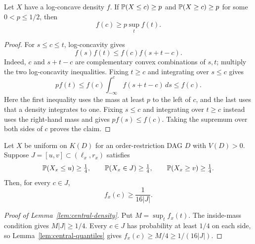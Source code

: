 \begin{lemma}\label{lem:central-quantiles}
Let $X$ have a log-concave density $f$. If
$\mathbb P(X\le c)\ge p$ and $\mathbb P(X\ge c)\ge p$ for some $0<p\le1/2$, then
\[
f(c)\ge p\sup_t f(t).
\]
\end{lemma}
\begin{proof}
For $s\le c\le t$, log-concavity gives
\[
f(s)f(t)\le f(c)f(s+t-c).
\]
Indeed, $c$ and $s+t-c$ are complementary convex combinations of $s,t$;
multiply the two log-concavity inequalities. Fixing $t\ge c$ and
integrating over $s\le c$ gives
\[
p f(t)\le f(c)\int_{-\infty}^c f(s+t-c)\,ds\le f(c).
\]
Here the first inequality uses the mass at least $p$ to the left of $c$,
and the last uses that a density integrates to one. Fixing $s\le c$ and
integrating over $t\ge c$ instead uses the right-hand mass and gives
$p f(s)\le f(c)$. Taking the supremum over both sides of $c$ proves the
claim.
\end{proof}

\begin{lemma}\label{lem:central-density}
Let $X$ be uniform on $K(D)$ for an order-restriction DAG $D$ with
$V(D)>0$. Suppose
$J=[u,v]\subset(\ell_x,r_x)$ satisfies
\[
\mathbb P(X_x\le u)\ge\tfrac14,\qquad
\mathbb P(X_x\in J)\ge\tfrac14,\qquad
\mathbb P(X_x\ge v)\ge\tfrac14.
\]
Then, for every $c\in J$,
\[
f_x(c)\ge\frac1{16|J|}.
\]
\end{lemma}
\begin{proof}[Proof of Lemma~\ref{lem:central-density}]
Put $M=\sup_t f_x(t)$. The inside-mass condition gives $M|J|\ge1/4$.
Every $c\in J$ has probability at least $1/4$ on each side, so
Lemma~\ref{lem:central-quantiles} gives $f_x(c)\ge M/4\ge1/(16|J|)$.
\end{proof}
